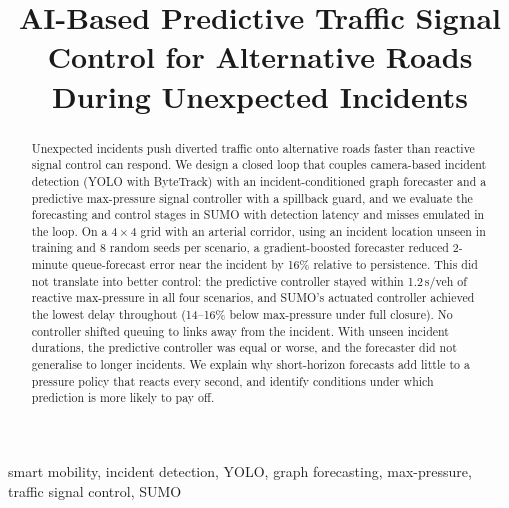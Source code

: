 \documentclass[conference]{IEEEtran}
\begin{document}
\title{AI-Based Predictive Traffic Signal Control for Alternative Roads During Unexpected Incidents}

\author{
\and
{}
}

\maketitle

\begin{abstract}
Unexpected incidents push diverted traffic onto alternative roads faster than reactive signal control can respond. We design a closed loop that couples camera-based incident detection (YOLO with ByteTrack) with an incident-conditioned graph forecaster and a predictive max-pressure signal controller with a spillback guard, and we evaluate the forecasting and control stages in SUMO with detection latency and misses emulated in the loop. On a $4\times4$ grid with an arterial corridor, using an incident location unseen in training and 8 random seeds per scenario, a gradient-boosted forecaster reduced 2-minute queue-forecast error near the incident by 16\% relative to persistence. This did not translate into better control: the predictive controller stayed within 1.2\,s/veh of reactive max-pressure in all four scenarios, and SUMO's actuated controller achieved the lowest delay throughout (14--16\% below max-pressure under full closure). No controller shifted queuing to links away from the incident. With unseen incident durations, the predictive controller was equal or worse, and the forecaster did not generalise to longer incidents. We explain why short-horizon forecasts add little to a pressure policy that reacts every second, and identify conditions under which prediction is more likely to pay off.
\end{abstract}

\begin{IEEEkeywords}
smart mobility, incident detection, YOLO, graph forecasting, max-pressure, traffic signal control, SUMO
\end{IEEEkeywords}
\end{document}
